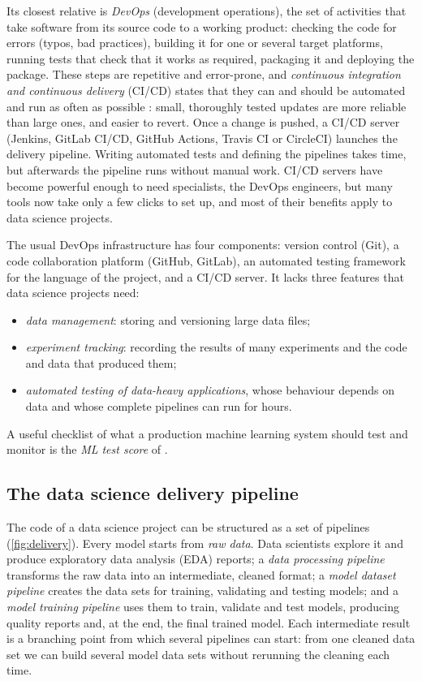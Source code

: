 Its closest relative is \emph{DevOps} (development operations), the set of activities that take
software from its source code to a working product: checking the code for errors (typos, bad
practices), building it for one or several target platforms, running tests that check that it works as
required, packaging it and deploying the package. These steps are repetitive and error-prone, and
\emph{continuous integration and continuous delivery} (CI/CD) states that they can and should be
automated and run as often as possible \citep{humble2010continuous}: small, thoroughly tested updates
are more reliable than large ones, and easier to revert. Once a change is pushed, a CI/CD server
(Jenkins, GitLab CI/CD, GitHub Actions, Travis CI or CircleCI) launches the delivery pipeline. Writing
automated tests and defining the pipelines takes time, but afterwards the pipeline runs without manual work. CI/CD
servers have become powerful enough to need specialists, the DevOps engineers, but many tools now take
only a few clicks to set up, and most of their benefits apply to data science projects.

The usual DevOps infrastructure has four components: version control (Git), a code collaboration
platform (GitHub, GitLab), an automated testing framework for the language of the project, and a CI/CD
server. It lacks three features that data science projects need:
\begin{itemize}
  \item \emph{data management}: storing and versioning large data files;
  \item \emph{experiment tracking}: recording the results of many experiments and the code and data that
        produced them;
  \item \emph{automated testing of data-heavy applications}, whose behaviour depends on data and whose
        complete pipelines can run for hours.
\end{itemize}
A useful checklist of what a production machine learning system should test and monitor is the
\emph{ML test score} of \citet{breck2017ml}.

\subsection{The data science delivery pipeline}

The code of a data science project can be structured as a set of pipelines
(\cref{fig:delivery}). Every model starts from \emph{raw data}. Data scientists explore it and produce
exploratory data analysis (EDA) reports; a \emph{data processing pipeline} transforms the raw data into an intermediate, cleaned
format; a \emph{model dataset pipeline} creates the data sets for training, validating and testing
models; and a \emph{model training pipeline} uses them to train, validate and test models, producing
quality reports and, at the end, the final trained model. Each intermediate result is a branching
point from which several pipelines can start: from one cleaned data set we can build several model
data sets without rerunning the cleaning each time.

